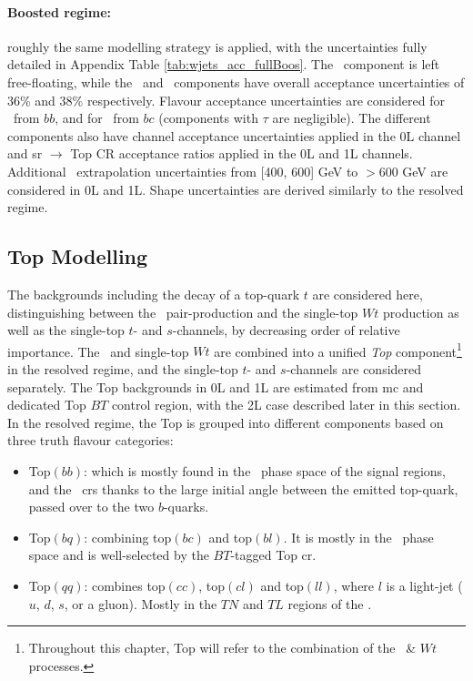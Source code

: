 \paragraph{Boosted regime:} roughly the same modelling strategy is applied, with the uncertainties fully detailed in Appendix Table \ref{tab:wjets_acc_fullBoos}. The \whf\ component is left free-floating, while the \wmf\ and \wlf\ components have overall acceptance uncertainties of 36\% and 38\% respectively. Flavour acceptance uncertainties are considered for \whf\ from $bb$, and for \wmf\ from $bc$ (components with $\tau$ are negligible). The different components also have channel acceptance uncertainties applied in the 0L channel and \gls{sr} $\rightarrow$ Top CR acceptance ratios applied in the 0L and 1L channels. Additional \ptv\ extrapolation uncertainties from [400, 600] GeV to $> 600$ GeV are considered in 0L and 1L. Shape uncertainties are derived similarly to the resolved regime. 

\subsection{Top Modelling}\label{sec-modTop} 
The backgrounds including the decay of a top-quark $t$ are considered here, distinguishing between the \ttb\ pair-production and the single-top $Wt$ production as well as the single-top $t$- and $s$-channels, by decreasing order of relative importance. The \ttb\ and single-top $Wt$ are combined into a unified \textit{Top} component\footnote{Throughout this chapter, Top will refer to the combination of the \ttb\ \& $Wt$ processes.} in the resolved regime, and the single-top $t$- and $s$-channels are considered separately. The Top backgrounds in 0L and 1L are estimated from \gls{mc} and dedicated Top $BT$ control region, with the 2L case described later in this section. In the resolved regime, the Top is grouped into different components based on three truth flavour categories:
\begin{itemize}
    \item Top$(bb)$: which is mostly found in the \vhb\ phase space of the signal regions, and the \highdr\ \glspl{cr} thanks to the large initial angle between the emitted top-quark, passed over to the two $b$-quarks. 
    \item Top$(bq)$: combining top$(bc)$ and top$(bl)$. It is mostly in the \vhc\ phase space and is well-selected by the $BT$-tagged Top \gls{cr}.
    \item Top$(qq)$: combines top$(cc)$, top$(cl)$ and top$(ll)$, where $l$ is a light-jet ($u$, $d$, $s$, or a gluon). Mostly in the $TN$ and $TL$ regions of the \vhc. 
\end{itemize}

